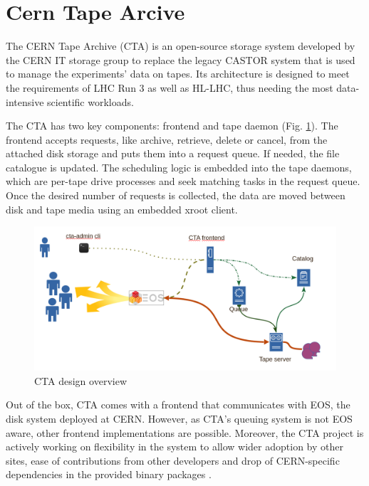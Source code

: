 \documentclass{webofc}
\begin{document}
\section{Cern Tape Arcive}
\label{sec:cta}

The CERN Tape Archive (CTA)\cite{cta} is an open-source storage system developed by the CERN IT storage group to
replace the legacy CASTOR system that is used to manage the experiments' data on tapes. Its architecture is designed
to meet the requirements of LHC Run 3 as well as HL-LHC, thus needing the most data-intensive scientific workloads.

The CTA has two key components: frontend and tape daemon (Fig. \ref{fig:cta_overview}). The frontend accepts requests, like archive, retrieve, delete or cancel, from the attached disk storage and puts them into a request queue. If needed, the file catalogue is updated. The scheduling logic is embedded into the tape daemons, which are per-tape drive processes and seek matching tasks in the request queue. Once the desired number of requests is collected, the data are moved between disk and tape media using an embedded xroot\cite{xrootd} client.

\begin{figure}[h]
    \centering
    \includegraphics[scale=0.25]{cta-design.png}
    \caption{CTA design overview}
    \label{fig:cta_overview}
\end{figure}

Out of the box, CTA comes with a frontend that communicates with EOS, the disk system deployed at CERN. However, as CTA's queuing system is not EOS aware, other frontend implementations are possible. Moreover, the CTA project is actively working on flexibility in the system to allow wider adoption by other sites, ease of contributions from other developers and drop of CERN-specific dependencies in the provided binary packages \cite{cta_beyond_cern}.
\end{document}
